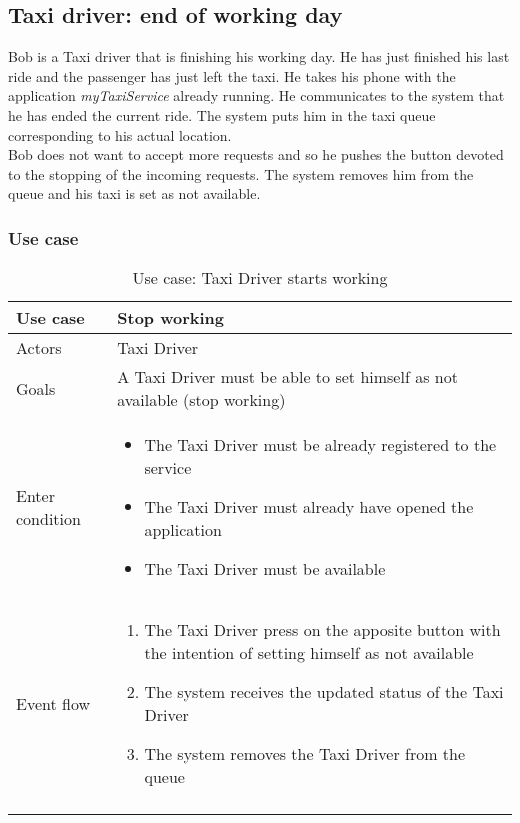 \subsection{Taxi driver: end of working day}
Bob is a Taxi driver that is finishing his working day. He has just finished his last ride and the passenger has just left the taxi. He takes his phone with the application \textit{myTaxiService} already running. He communicates to the system that he has ended the current ride. The system puts him in the taxi queue corresponding to his actual location.\\
Bob does not want to accept more requests and so he pushes the button devoted to the stopping of the incoming requests. The system removes him from the queue and his taxi is set as not available.

\subsubsection{Use case}
\begin{center}
\begin{longtable}{| p{} | p{} |} \hline
	Use case & \textbf{Stop working} \\ \hline 
	Actors & Taxi Driver \\ \hline
	Goals & A Taxi Driver must be able to set himself as not available (stop working)  \\ \hline
	Enter condition & \begin{itemize}
						\item The Taxi Driver must be already registered to the service
						\item The Taxi Driver must already have opened the application
						\item The Taxi Driver must be available
						\end{itemize} \\ \hline
	Event flow & \begin{enumerate}
					\item The Taxi Driver press on the apposite button with the intention of setting himself as not available
					\item The system receives the updated status of the Taxi Driver
					\item The system removes the Taxi Driver from the queue
				\end{enumerate} \\ \hline
	\caption{Use case: Taxi Driver starts working}
\end{longtable}
\end{center}